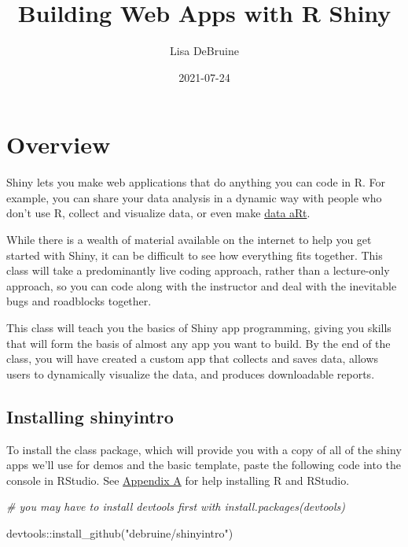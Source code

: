\documentclass[
  oneside]{book}
\title{Building Web Apps with R Shiny}
\author{Lisa DeBruine}
\date{2021-07-24}
\newenvironment{Shaded}{\begin{snugshade}}{\end{snugshade}}
\newcommand{\CommentTok}[1]{\textcolor[rgb]{0.56,0.35,0.01}{\textit{#1}}}
\newcommand{\FunctionTok}[1]{\textcolor[rgb]{0.00,0.00,0.00}{#1}}
\newcommand{\NormalTok}[1]{#1}
\newcommand{\SpecialCharTok}[1]{\textcolor[rgb]{0.00,0.00,0.00}{#1}}
\newcommand{\StringTok}[1]{\textcolor[rgb]{0.31,0.60,0.02}{#1}}
\begin{document}
\maketitle

{
\setcounter{tocdepth}{1}
\tableofcontents
}
\hypertarget{overview}{%
\chapter*{Overview}\label{overview}}

Shiny lets you make web applications that do anything you can code in R. For example, you can share your data analysis in a dynamic way with people who don't use R, collect and visualize data, or even make \href{https://towardsdatascience.com/getting-started-with-generative-art-in-r-3bc50067d34b}{data aRt}.

While there is a wealth of material available on the internet to help you get started with Shiny, it can be difficult to see how everything fits together. This class will take a predominantly live coding approach, rather than a lecture-only approach, so you can code along with the instructor and deal with the inevitable bugs and roadblocks together.

This class will teach you the basics of Shiny app programming, giving you skills that will form the basis of almost any app you want to build. By the end of the class, you will have created a custom app that collects and saves data, allows users to dynamically visualize the data, and produces downloadable reports.

\hypertarget{installing-shinyintro}{%
\section{Installing shinyintro}\label{installing-shinyintro}}

To install the class package, which will provide you with a copy of all of the shiny apps we'll use for demos and the basic template, paste the following code into the console in RStudio. See \protect\hyperlink{installing-r}{Appendix A} for help installing R and RStudio.

\begin{Shaded}
\begin{Highlighting}[]
\CommentTok{\# you may have to install devtools first with install.packages(\textquotesingle{}devtools\textquotesingle{})}

\NormalTok{devtools}\SpecialCharTok{::}\FunctionTok{install\_github}\NormalTok{(}\StringTok{"debruine/shinyintro"}\NormalTok{)}
\end{Highlighting}
\end{Shaded}
\end{document}

